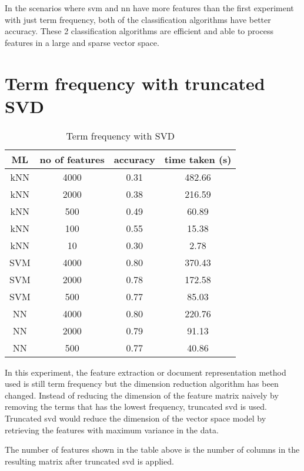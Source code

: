 In the scenarios where \ac{svm} and \ac{nn} have more features than the first experiment with just term frequency, both of the classification algorithms have better accuracy. These 2 classification algorithms are efficient and able to process features in a large and sparse vector space.


\clearpage
\section{Term frequency with truncated SVD}

\begin{table} [ht]
	\centering
	\begin{tabular}{|| c | c | c | c||}
		\hline
		ML & no of features & accuracy & time taken (s) \\ [0.5ex]
		\hline\hline
		kNN & 4000 & 0.31 & 482.66 \\
		\hline
		kNN & 2000 & 0.38 & 216.59 \\ 
		\hline
		kNN & 500 & 0.49 & 60.89 \\ 
		\hline
		kNN & 100 & 0.55 & 15.38 \\ 
		\hline
		kNN & 10 & 0.30 & 2.78 \\ 
		\hline\hline
		SVM & 4000 & 0.80 & 370.43 \\
		\hline
		SVM & 2000 & 0.78 & 172.58 \\
		\hline
		SVM & 500 & 0.77 & 85.03 \\
		\hline\hline
		NN & 4000 & 0.80 & 220.76 \\
		\hline
		NN & 2000 & 0.79 & 91.13 \\
		\hline
		NN & 500 & 0.77 & 40.86 \\
		\hline
	\end{tabular}
\caption{Term frequency with SVD}
\label{tbl:termFrequencySvd}
\end{table}

In this experiment, the feature extraction or document representation method used is still term frequency but the dimension reduction algorithm has been changed. Instead of reducing the dimension of the feature matrix naively by removing the terms that has the lowest frequency, truncated \ac{svd} is used. Truncated \ac{svd} would reduce the dimension of the vector space model by retrieving the features with maximum variance in the data.

The number of features shown in the table above is the number of columns in the resulting matrix after truncated \ac{svd} is applied.

